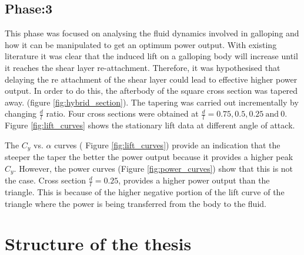 \documentclass[authoryear,12pt]{article}
\newcommand{\ratio}{\ensuremath{\frac{d}{l}}}
\begin{document}
\clearpage

\subsection{Phase:3}

This phase was focused on analysing the fluid dynamics involved in galloping and how it can be manipulated to get an optimum power output. With existing literature it was clear that the induced lift on a galloping body will increase until it reaches the shear layer re-attachment. Therefore, it was hypothesised that delaying the re attachment of the shear layer could lead to effective higher power output. In order to do this, the afterbody of the square cross section was tapered away. (figure \ref{fig:hybrid_section}). The tapering was carried out incrementally by changing $\frac{d}{l}$ ratio. Four cross sections were obtained at $\frac{d}{l}= 0.75,0.5,0.25 \ \text{and} \ 0$. Figure \ref{fig:lift_curves} shows the stationary lift data at different angle of attack. 

 




The $C_y$ vs. $\alpha$ curves ( Figure \ref{fig:lift_curves}) provide an indication that the steeper the taper the better the power output because it provides a higher peak $C_y$. However, the power curves (Figure \ref{fig:power_curves}) show that this is not the case. Cross section $\ratio=0.25$, provides a higher power output than the triangle. This is because of the higher negative portion of the lift curve of the triangle where the power is being transferred from the body to the fluid.  










\clearpage

\section{Structure of the thesis}
\end{document}
